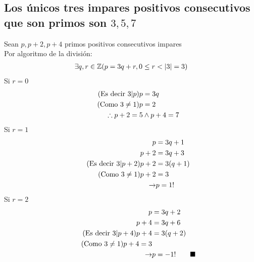     \subsection{Los únicos tres impares positivos consecutivos que son primos son $3, 5, 7$}
        Sean $p,p+2,p+4$ primos positivos consecutivos impares\\
        Por algoritmo de la división: \\
        \begin{align}
            \notag \exists q,r \in \mathbb{Z} (p = 3q+r, 0 \leq r < |3| = 3)
        \end{align}
        Si $r=0$ 
        \begin{align}
            \tag{Es decir $3|p$} p &= 3q \\
            \tag{Como $3 \neq 1$} p &= 2 \\
            \notag \therefore p+2 = 5 &\wedge p+4 = 7
        \end{align}
        Si $r=1$
        \begin{align}
            \notag p &= 3q+1 \\
            \notag p+2 &= 3q+3 \\
            \tag{Es decir $3|p+2$} p+2 &= 3(q+1) \\
            \tag{Como $3 \neq 1$} p+2 &= 3 \\
            \notag \rightarrow& p = 1 !
        \end{align}
        Si $r=2$
        \begin{align}
            \notag p &= 3q+2 \\
            \notag p+4 &= 3q+6 \\
            \tag{Es decir $3|p+4$} p+4 &= 3(q+2) \\
            \tag{Como $ 3 \neq 1$} p+4 = 3 \\
            \notag \rightarrow& p = -1 ! \qquad \blacksquare
        \end{align}